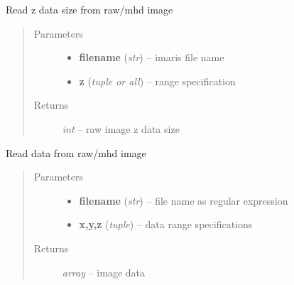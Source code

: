\documentclass[letterpaper,10pt,english]{sphinxmanual}
\begin{document}
\begin{fulllineitems}
\label{api/ClearMap.IO:ClearMap.IO.RAW.dataZSize}
Read z data size from raw/mhd image
\begin{quote}\begin{description}
\item[{Parameters}] \leavevmode\begin{itemize}
\item {} 
\textbf{filename} (\emph{str}) --
imaris file name

\item {} 
\textbf{z} (\emph{tuple or all}) --
range specification

\end{itemize}

\item[{Returns}] \leavevmode
\emph{int} --
raw image z data size

\end{description}\end{quote}

\end{fulllineitems}


\begin{fulllineitems}
\label{api/ClearMap.IO:ClearMap.IO.RAW.readData}
Read data from raw/mhd image
\begin{quote}\begin{description}
\item[{Parameters}] \leavevmode\begin{itemize}
\item {} 
\textbf{filename} (\emph{str}) --
file name as regular expression

\item {} 
\textbf{x,y,z} (\emph{tuple}) --
data range specifications

\end{itemize}

\item[{Returns}] \leavevmode
\emph{array} --
image data

\end{description}\end{quote}

\end{fulllineitems}
\end{document}
